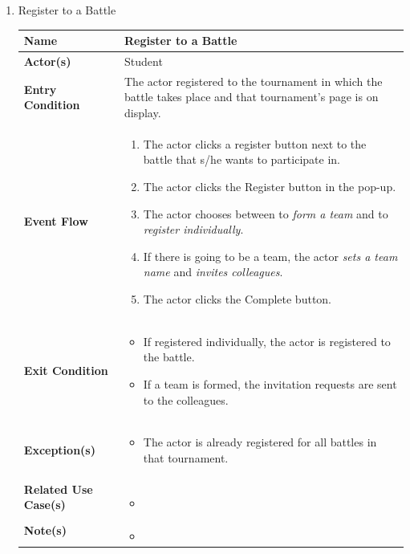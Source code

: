 \begin{enumerate}
\item Register to a Battle
\begin{center}
    \begin{tabular}{ | m{10em} | m{10cm}| } 
      \hline
      \textbf{Name} & Register to a Battle  \\ 
      \hline
      \textbf{Actor(s)} & Student \\ 
      \hline
      \textbf{Entry Condition} & The actor registered to the tournament in which the battle takes place and that tournament's page is on display. \\ 
      \hline
      \textbf{Event Flow} & 
          \begin{enumerate}[(1)]
              \item The actor clicks a register button next to the battle that s/he wants to participate in.
              \item The actor clicks the Register button in the pop-up.
              \item The actor chooses between to \textit{form a team} and to \textit{register individually}. 
              \item If there is going to be a team, the actor \textit{sets a team name} and \textit{invites colleagues}.
              \item The actor clicks the Complete button.
          \end{enumerate}
      \\ 
      \hline
      \textbf{Exit Condition} & 
      \begin{itemize}
          \item If registered individually, the actor is registered to the battle.
          \item If a team is formed, the invitation requests are sent to the colleagues.
      \end{itemize}
        \\ 
      \hline
      \textbf{Exception(s)} & 
      \begin{itemize}
          \item The actor is already registered for all battles in that tournament.
      \end{itemize}
          \\ 
      \hline
      \textbf{Related Use Case(s)} & 
      \begin{itemize}
          \item 
      \end{itemize}
          \\ 
      \hline
      \textbf{Note(s)} & 
      \begin{itemize}
          \item 
      \end{itemize}
          \\ 
      \hline
    \end{tabular}
\end{center}




\end{enumerate}
